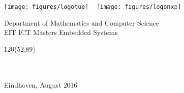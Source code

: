 \begin{titlepage}
	\begin{center}
		
		
		\texttt{[image: figures/logotue]}
		\hspace*{3cm}~%
		\texttt{[image: figures/logonxp]} \\[2cm]
		\large
		\begin{center}
			Department of Mathematics and Computer Science  \\
			EIT ICT Masters Embedded Systems
		\end{center}
		\vspace*{10cm}
		\setlength{\TPHorizModule}{1mm}
		\setlength{\TPVertModule}{\TPHorizModule}
		\newlength{\backupparindent}
		\setlength{\backupparindent}{\parindent}
		\setlength{\parindent}{0mm}			
		
		\begin{textblock}{120}(52,89)
			\vspace*{10mm}    
			\noindent\makebox[\linewidth]{\rule{\textwidth}{1pt}}
			\huge
			\textbf{\doctitle \\}
			\huge
			\noindent\makebox[\linewidth]{\rule{\textwidth}{1.2pt}}    
			\Large
			\vspace*{6mm}
			\textit{\docsubtitle}\\
			\vspace*{10mm}
			\Large
			\me\\
		\end{textblock}
		
		

\begin{table}[h]
	\centering
\end{table}



\vfill
\Large 
\vspace*{1cm}
\Large
Eindhoven, August 2016\

\setlength{\parindent}{\backupparindent}
\end{center}
\end{titlepage} 